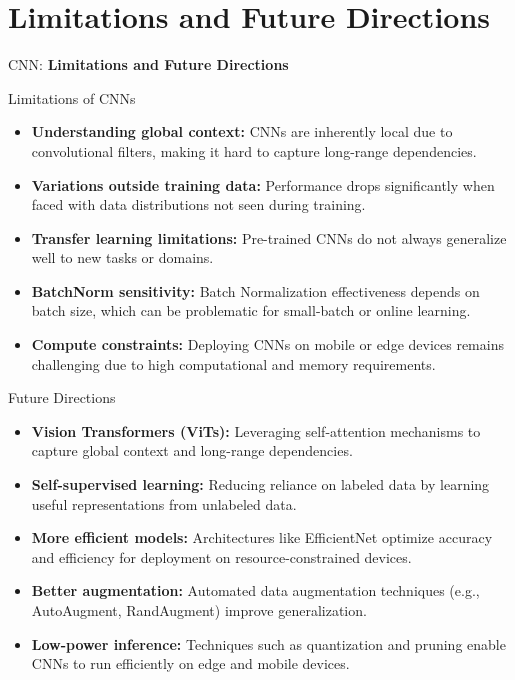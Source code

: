 \section{Limitations and Future Directions}
\begin{frame}{}
    \LARGE CNN: \textbf{Limitations and Future Directions}
\end{frame}

\begin{frame}{Limitations of CNNs}
    \begin{itemize}
        \item \textbf{Understanding global context:} CNNs are inherently local due to convolutional filters, making it hard to capture long-range dependencies.
        \item \textbf{Variations outside training data:} Performance drops significantly when faced with data distributions not seen during training.
        \item \textbf{Transfer learning limitations:} Pre-trained CNNs do not always generalize well to new tasks or domains.
        \item \textbf{BatchNorm sensitivity:} Batch Normalization effectiveness depends on batch size, which can be problematic for small-batch or online learning.
        \item \textbf{Compute constraints:} Deploying CNNs on mobile or edge devices remains challenging due to high computational and memory requirements.
    \end{itemize}
\end{frame}

\begin{frame}{Future Directions}
    \begin{itemize}
        \item \textbf{Vision Transformers (ViTs):} Leveraging self-attention mechanisms to capture global context and long-range dependencies.
        \item \textbf{Self-supervised learning:} Reducing reliance on labeled data by learning useful representations from unlabeled data.
        \item \textbf{More efficient models:} Architectures like EfficientNet optimize accuracy and efficiency for deployment on resource-constrained devices.
        \item \textbf{Better augmentation:} Automated data augmentation techniques (e.g., AutoAugment, RandAugment) improve generalization.
        \item \textbf{Low-power inference:} Techniques such as quantization and pruning enable CNNs to run efficiently on edge and mobile devices.
    \end{itemize}
\end{frame}
